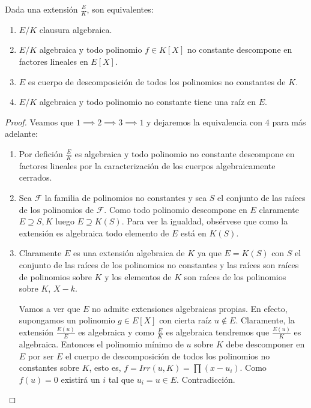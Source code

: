 \begin{proposition}
Dada una extensión $\frac{E}{K}$, son equivalentes:

\begin{enumerate}
\item $E/K$ clausura algebraica.
\item $E/K$ algebraica y todo polinomio $f \in K[X]$ no constante  descompone en factores lineales en $E[X]$.
\item $E$ es cuerpo de descomposición de todos los polinomios no constantes de $K$.
\item $E/K$ algebraica y todo polinomio no constante tiene una raíz en $E$.
\end{enumerate}
\end{proposition}
\begin{proof}
Veamos que $1 \implies 2 \implies 3 \implies 1$ y dejaremos la equivalencia con $4$ para más adelante:

\begin{enumerate}
\item Por defición $\frac{E}{K}$ es algebraica y todo polinomio no constante descompone en factores lineales por la caracterización de los cuerpos algebraicamente cerrados. 
\item Sea $\mathcal{F}$ la familia de polinomios no constantes y sea $S$ el conjunto de las raíces de los polinomios de $\mathcal{F}$. Como todo polinomio descompone en $E$ claramente $E \supseteq S,K$ luego $E \supseteq K(S)$. Para ver la igualdad, obsérvese que como la extensión es algebraica todo elemento de $E$ está en $K(S)$. 
\item Claramente $E$ es una extensión algebraica de $K$ ya que $E = K(S)$ con $S$ el conjunto de las raíces de los polinomios no constantes y las raíces son raíces de polinomios sobre $K$ y los elementos de $K$ son raíces de los polinomios sobre $K$, $X-k$. 

Vamos a ver que $E$ no admite extensiones algebraicas propias. En efecto, supongamos un polinomio $g \in E[X]$ con cierta raíz $u \notin E$. Claramente, la extensión $\frac{E(u)}{E}$ es algebraica y como $\frac{E}{K}$ es algebraica tendremos que $\frac{E(u)}{K}$ es algebraica. Entonces el polinomio mínimo de $u$ sobre $K$ debe descomponer en $E$ por ser $E$ el cuerpo de descomposición de todos los polinomios no constantes sobre $K$, esto es, $f = Irr(u,K) = \prod (x-u_i)$. Como $f(u) = 0$ existirá un $i$ tal que $u_i = u \in E$. Contradicción. 
\end{enumerate}
\end{proof}

